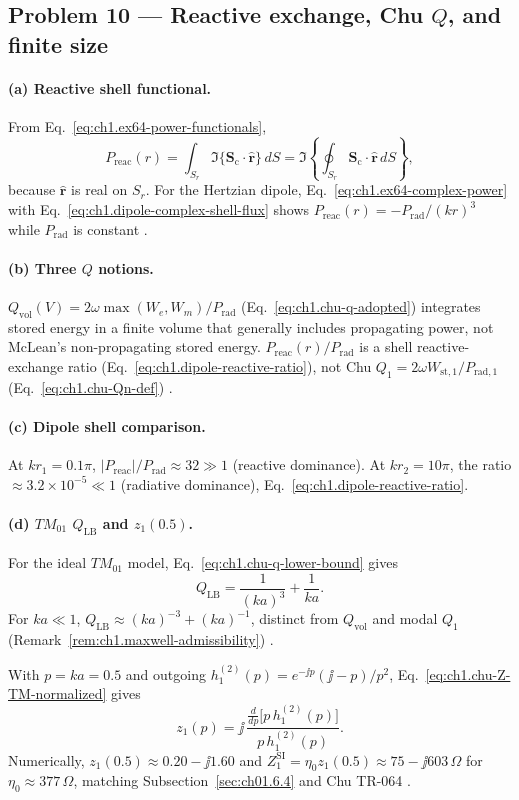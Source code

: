 \subsection*{Problem 10 --- Reactive exchange, Chu $Q$, and finite size}

\paragraph{(a) Reactive shell functional.}
From Eq.~\eqref{eq:ch1.ex64-power-functionals},
\[
P_{\mathrm{reac}}(r)=\int_{S_r}\Im\{\mathbf{S}_\mathrm{c}\cdot\hat{\mathbf{r}}\}\,dS
=\Im\!\left\{\oint_{S_r}\mathbf{S}_\mathrm{c}\cdot\hat{\mathbf{r}}\,dS\right\},
\]
because $\hat{\mathbf{r}}$ is real on $S_r$. For the Hertzian dipole, Eq.~\eqref{eq:ch1.ex64-complex-power} with Eq.~\eqref{eq:ch1.dipole-complex-shell-flux} shows $P_{\mathrm{reac}}(r)=-P_{\mathrm{rad}}/(kr)^3$ while $P_{\mathrm{rad}}$ is constant \cite{poynting1884,stratton1941}.

\paragraph{(b) Three $Q$ notions.}
$Q_{\mathrm{vol}}(V)=2\omega\max(W_e,W_m)/P_{\mathrm{rad}}$ (Eq.~\eqref{eq:ch1.chu-q-adopted}) integrates stored energy in a finite volume that generally includes propagating power, not McLean's non-propagating stored energy. $P_{\mathrm{reac}}(r)/P_{\mathrm{rad}}$ is a shell reactive-exchange ratio (Eq.~\eqref{eq:ch1.dipole-reactive-ratio}), not Chu $Q_1=2\omega W_{\mathrm{st,1}}/P_{\mathrm{rad,1}}$ (Eq.~\eqref{eq:ch1.chu-Qn-def}) \cite{chu1948,mcclean1996}.

\paragraph{(c) Dipole shell comparison.}
At $kr_1=0.1\pi$, $|P_{\mathrm{reac}}|/P_{\mathrm{rad}}\approx32\gg1$ (reactive dominance). At $kr_2=10\pi$, the ratio $\approx3.2\times10^{-5}\ll1$ (radiative dominance), Eq.~\eqref{eq:ch1.dipole-reactive-ratio}.

\paragraph{(d) $TM_{01}$ $Q_{\mathrm{LB}}$ and $z_1(0.5)$.}
For the ideal $TM_{01}$ model, Eq.~\eqref{eq:ch1.chu-q-lower-bound} gives
\[
Q_{\mathrm{LB}}=\frac{1}{(ka)^3}+\frac{1}{ka}.
\]
For $ka\ll1$, $Q_{\mathrm{LB}}\approx(ka)^{-3}+(ka)^{-1}$, distinct from $Q_{\mathrm{vol}}$ and modal $Q_1$ (Remark~\ref{rem:ch1.maxwell-admissibility}) \cite{mcclean1996,chu1948}.

With $p=ka=0.5$ and outgoing $h_1^{(2)}(p)=e^{-\jj p}(\jj-p)/p^2$, Eq.~\eqref{eq:ch1.chu-Z-TM-normalized} gives
\[
z_1(p)=\jj\,\frac{\displaystyle\frac{d}{dp}\bigl[p\,h_1^{(2)}(p)\bigr]}{p\,h_1^{(2)}(p)}.
\]
Numerically, $z_1(0.5)\approx0.20-\jj1.60$ and $Z_1^{\mathrm{SI}}=\eta_0 z_1(0.5)\approx75-\jj603\,\Omega$ for $\eta_0\approx377\,\Omega$, matching Subsection~\ref{sec:ch01.6.4} and Chu TR-064 \cite{chu1948tr064,stratton1941}.